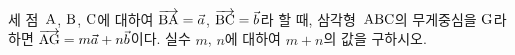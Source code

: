 세 점~$\mathrm{A}$, $\mathrm{B}$, $\mathrm{C}$에 대하여 $\overrightarrow{\mathrm{BA}}=\vec{a}$, $\overrightarrow{\mathrm{BC}}=\vec{b}$라 할 때, 삼각형~$\mathrm{ABC}$의 무게중심을 $\mathrm{G}$라 하면 $\overrightarrow{\mathrm{AG}}=m\vec{a}+n\vec{b}$이다. 실수 $m$, $n$에 대하여 $m+n$의 값을 구하시오.
